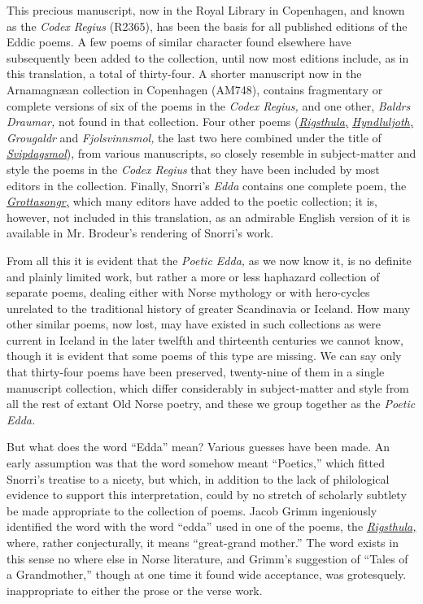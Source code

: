 \documentclass{scrbook}
\newcommand{\chapterref}[1]{\hyperref[cha:#1]{\emph{#1}}}
\begin{document}
This precious manuscript, now in the Royal Library in Copenhagen, and known as the \emph{Codex Regius} (R2365), has been the basis for all published editions of the Eddic poems. A few poems of similar character found elsewhere have subsequently been added to the collection, until now most editions include, as in this translation, a total of thirty-four. A shorter manuscript now in the Arnamagnæan collection in Copenhagen (AM748), contains fragmentary or complete versions of six of the poems in the \emph{Codex Regius,} and one other, \emph{Baldrs Draumar,} not found in that collection. Four other poems (\chapterref{Rigsthula,} \chapterref{Hyndluljoth,} \emph{Grougaldr} and \emph{Fjolsvinnsmol,} the last two here combined under the title of \chapterref{Svipdagsmol}), from various manuscripts, so closely resemble in subject-matter and style the poems in the \emph{Codex Regius} that they have been included by most editors in the collection. Finally, Snorri's \emph{Edda} contains one complete poem, the \chapterref{Grottasongr,} which many editors have added to the poetic collection; it is, however, not included in this translation, as an admirable English version of it is available in Mr. Brodeur's rendering of Snorri's work.

From all this it is evident that the \emph{Poetic Edda,} as we now know it, is no definite and plainly limited work, but rather a more or less haphazard collection of separate poems, dealing either with Norse mythology or with hero-cycles unrelated to the traditional history of greater Scandinavia or Iceland. How many other similar poems, now lost, may have existed in such collections as were current in Iceland in the later twelfth and thirteenth centuries we cannot know, though it is evident that some poems of this type are missing. We can say only that thirty-four poems have been preserved, twenty-nine of them in a single manuscript collection, which differ considerably in subject-matter and style from all the rest of extant Old Norse poetry, and these we group together as the \emph{Poetic Edda.}

But what does the word ``Edda'' mean? Various guesses have been made. An early assumption was that the word somehow meant ``Poetics,'' which fitted Snorri's treatise to a nicety, but which, in addition to the lack of philological evidence to support this interpretation, could by no stretch of scholarly subtlety be made appropriate to the collection of poems. Jacob Grimm ingeniously identified the word with the word ``edda'' used in one of the poems, the \chapterref{Rigsthula,} where, rather conjecturally, it means ``great-grand mother.'' The word exists in this sense no where else in Norse literature, and Grimm's suggestion of ``Tales of a Grandmother,'' though at one time it found wide acceptance, was grotesquely. inappropriate to either the prose or the verse work.
\end{document}

